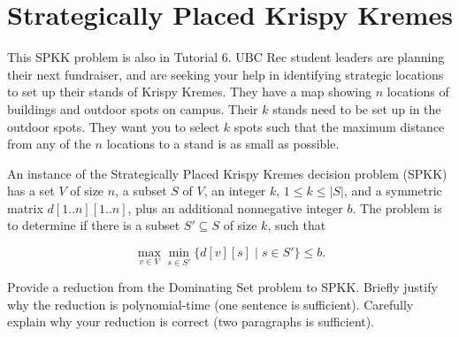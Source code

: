 \section{Strategically Placed Krispy Kremes}

This SPKK problem is also in Tutorial 6. UBC Rec student leaders are planning their next fundraiser, and are seeking your help in identifying strategic locations to set up their stands of Krispy Kremes. They have a map showing $n$ locations of buildings and outdoor spots on campus. Their $k$ stands need to be set up in the outdoor spots. They want you to select $k$ spots such that the maximum distance from any of the $n$ locations to a stand is as small as possible.

An instance of the Strategically Placed Krispy Kremes decision problem (SPKK) has a set $V$ of size $n$, a subset $S$ of $V$, an integer $k$, $1\le k \le |S|$,  and a symmetric matrix $d[1..n][1..n]$, plus an additional nonnegative integer $b$. The problem is to determine if there is a subset $S' \subseteq S$ of size $k$, such that

\[
\max_{v \in V} \min_{s \in S'} \{ d[v][s] \;|\; s \in S' \} \le b.
\]

\begin{questions}
\question[8]
Provide a reduction from the Dominating Set problem to SPKK.
Briefly justify why the reduction is polynomial-time (one sentence is sufficient). Carefully explain why your reduction is correct (two paragraphs is sufficient).

 
  \ifsolutions\fi
  \end{questions}
